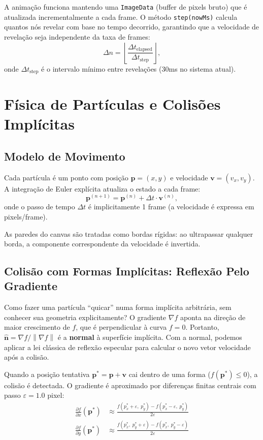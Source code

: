 \documentclass[11pt,a4paper]{article}
\theoremstyle{plain}
\theoremstyle{definition}
\newcommand{\vv}[1]{\mathbf{#1}}
\newcommand{\norm}[1]{\left\|#1\right\|}
\newcommand{\grad}{\nabla}
\newcommand{\eps}{\varepsilon}
\begin{document}
A animação funciona mantendo uma \texttt{ImageData} (buffer de pixels bruto)
que é atualizada incrementalmente a cada frame. O método \texttt{step(nowMs)}
calcula quantos nós revelar com base no tempo decorrido, garantindo que a
velocidade de revelação seja independente da taxa de frames:
\[
    \Delta n = \left\lfloor \frac{\Delta t_{\text{elapsed}}}{\Delta t_{\text{step}}} \right\rfloor,
\]
onde $\Delta t_{\text{step}}$ é o intervalo mínimo entre revelações (30ms
no sistema atual).

\section{Física de Partículas e Colisões Implícitas}
\label{sec:particulas}

\subsection{Modelo de Movimento}

Cada partícula é um ponto com posição $\vv{p} = (x, y)$ e velocidade
$\vv{v} = (v_x, v_y)$. A integração de Euler explícita atualiza o estado a
cada frame:
\[
    \vv{p}^{(n+1)} = \vv{p}^{(n)} + \Delta t \cdot \vv{v}^{(n)},
\]
onde o passo de tempo $\Delta t$ é implicitamente 1 frame (a velocidade é
expressa em pixels/frame).

As paredes do canvas são tratadas como bordas rígidas: ao ultrapassar qualquer
borda, a componente correspondente da velocidade é invertida.

\subsection{Colisão com Formas Implícitas: Reflexão Pelo Gradiente}

\begin{tcolorbox}[motivacao]
Como fazer uma partícula ``quicar'' numa forma implícita arbitrária, sem conhecer
sua geometria explicitamente? O gradiente $\grad f$ aponta na direção de maior
crescimento de $f$, que é perpendicular à curva $f = 0$. Portanto,
$\hat{\vv{n}} = \grad f / \norm{\grad f}$ é a \textbf{normal} à superfície
implícita. Com a normal, podemos aplicar a lei clássica de reflexão especular
para calcular o novo vetor velocidade após a colisão.
\end{tcolorbox}

Quando a posição tentativa $\vv{p}^* = \vv{p} + \vv{v}$ cai dentro de uma
forma ($f(\vv{p}^*) \leq 0$), a colisão é detectada. O gradiente é aproximado
por diferenças finitas centrais com passo $\eps = 1.0$ pixel:
\begin{align}
    \frac{\partial f}{\partial x}(\vv{p}^*) &\approx
        \frac{f(p^*_x + \eps,\; p^*_y) - f(p^*_x - \eps,\; p^*_y)}{2\eps}
        \label{eq:grad_x} \\
    \frac{\partial f}{\partial y}(\vv{p}^*) &\approx
        \frac{f(p^*_x,\; p^*_y + \eps) - f(p^*_x,\; p^*_y - \eps)}{2\eps}
        \label{eq:grad_y}
\end{align}
\end{document}
